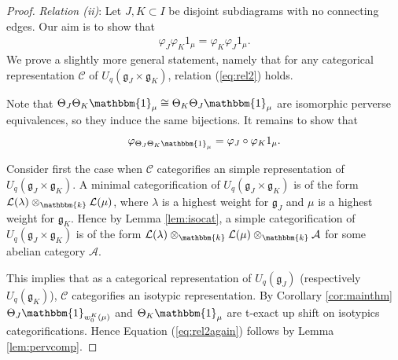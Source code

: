 \documentclass[11pt,reqno]{amsart}
\numberwithin{equation}{section}
\theoremstyle{definition}
\theoremstyle{named}
\newcommand{\cA}{\mathcal{A}}
\newcommand{\cC}{\mathcal{C}}
\newcommand{\cL}{\mathcal{L}}
\newcommand{\fg}{\mathfrak{g}}
\newcommand{\kk}{\mathbbm{k}}
\newcommand{\bone}{\mathbbm{1}}
\begin{document}
\begin{proof}

\textit{Relation (ii)}:  Let $J,K \subset I$ be disjoint subdiagrams with no connecting edges.  Our aim is to show that
\begin{align}\label{eq:rel2}
\varphi_J\varphi_K1_\mu = \varphi_K \varphi_J1_\mu.
\end{align}
We prove a slightly more general statement, namely that for any categorical representation $\cC$ of $U_q(\fg_J \times\fg_K)$, relation (\ref{eq:rel2}) holds.

Note that $\Theta_J\Theta_K\bone_\mu\cong \Theta_K\Theta_J\bone_\mu$ are isomorphic perverse equivalences, so they induce the same bijections.  It remains to show that
\begin{align}\label{eq:rel2again}
\varphi_{\Theta_J\Theta_K\bone_\mu} =\varphi_J\circ\varphi_K 1_\mu.
\end{align}

Consider first the case when $\cC$ categorifies an simple representation of $U_q(\fg_J\times\fg_K)$.  A minimal categorification of $U_q(\fg_J\times\fg_K)$ is of the form $\cL(\lambda)\otimes_\kk\cL(\mu)$, where $\lambda$ is a highest weight for $\fg_J$ and $\mu$ is a highest weight for $\fg_K$.  Hence by Lemma \ref{lem:isocat}, a simple categorification of $U_q(\fg_J\times\fg_K)$ is of the form $\cL(\lambda)\otimes_\kk\cL(\mu)\otimes_\kk\cA$ for some abelian category $\cA$.  

This implies that as a categorical representation of $U_q(\fg_J)$ (respectively $U_q(\fg_K)$), $\cC$  categorifies an isotypic representation.  
By Corollary \ref{cor:mainthm} $\Theta_J\bone_{w_0^K(\mu)}$ and $\Theta_K\bone_\mu$ are t-exact up shift on isotypics categorifications.  Hence Equation (\ref{eq:rel2again}) follows by Lemma \ref{lem:pervcomp}.


\end{proof}
\end{document}
